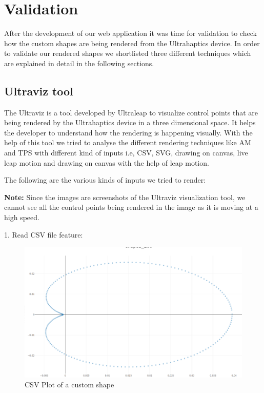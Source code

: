 
\chapter{Validation}
\label{sec:validation}

After the development of our web application it was time for validation to check how the custom shapes are being rendered from the Ultrahaptics device. In order to validate our rendered shapes we shortlisted three different techniques which are explained in detail in the following sections.


\section{Ultraviz tool}
\label{sec:validation:ultraviz}

The Ultraviz is a tool developed by Ultraleap \cite{ul}\cite{ultraviz} to visualize control points that are being rendered by the Ultrahaptics device in a three dimensional space. It helps the developer to understand how the rendering is happening visually. With the help of this tool we tried to analyse the different rendering techniques like AM and TPS with different kind of inputs i.e, CSV, SVG, drawing on canvas, live leap motion and drawing on canvas with the help of leap motion. 

The following are the various kinds of inputs we tried to render:

\textbf{Note:} Since the images are screenshots of the Ultraviz visualization tool, we cannot see all the control points being rendered in the image as it is moving at a high speed.

1. Read CSV file feature:
\begin{figure}[H]
	\includegraphics[width=\textwidth]{gfx/Read CSV Image.png}
	\caption{CSV Plot of a custom shape}
	\label{fig:validation:csv}
\end{figure}

